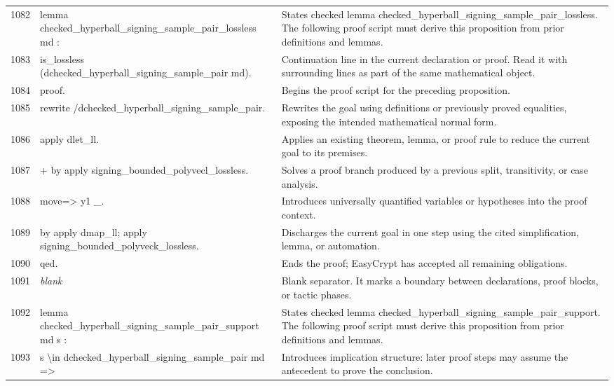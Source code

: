 \documentclass[10pt]{article}
\begin{document}
\begin{longtable}{r L{0.53\textwidth} L{0.37\textwidth}}
1082 & {\ttfamily\scriptsize lemma checked\_hyperball\_signing\_sample\_pair\_lossless md :} & States checked lemma checked\_hyperball\_signing\_sample\_pair\_lossless.  The following proof script must derive this proposition from prior definitions and lemmas. \\
1083 & {\ttfamily\scriptsize   is\_lossless (dchecked\_hyperball\_signing\_sample\_pair md).} & Continuation line in the current declaration or proof.  Read it with surrounding lines as part of the same mathematical object. \\
1084 & {\ttfamily\scriptsize proof.} & Begins the proof script for the preceding proposition. \\
1085 & {\ttfamily\scriptsize rewrite /dchecked\_hyperball\_signing\_sample\_pair.} & Rewrites the goal using definitions or previously proved equalities, exposing the intended mathematical normal form. \\
1086 & {\ttfamily\scriptsize apply dlet\_ll.} & Applies an existing theorem, lemma, or proof rule to reduce the current goal to its premises. \\
1087 & {\ttfamily\scriptsize + by apply signing\_bounded\_polyvecl\_lossless.} & Solves a proof branch produced by a previous split, transitivity, or case analysis. \\
1088 & {\ttfamily\scriptsize move=> y1 \_.} & Introduces universally quantified variables or hypotheses into the proof context. \\
1089 & {\ttfamily\scriptsize by apply dmap\_ll; apply signing\_bounded\_polyveck\_lossless.} & Discharges the current goal in one step using the cited simplification, lemma, or automation. \\
1090 & {\ttfamily\scriptsize qed.} & Ends the proof; EasyCrypt has accepted all remaining obligations. \\
1091 & {\ttfamily\scriptsize \emph{blank}} & Blank separator.  It marks a boundary between declarations, proof blocks, or tactic phases. \\
1092 & {\ttfamily\scriptsize lemma checked\_hyperball\_signing\_sample\_pair\_support md s :} & States checked lemma checked\_hyperball\_signing\_sample\_pair\_support.  The following proof script must derive this proposition from prior definitions and lemmas. \\
1093 & {\ttfamily\scriptsize   s \textbackslash{}in dchecked\_hyperball\_signing\_sample\_pair md =>} & Introduces implication structure: later proof steps may assume the antecedent to prove the conclusion. \\

\end{longtable}
\end{document}
